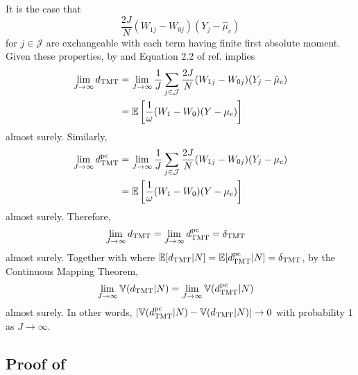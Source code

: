 \documentclass[12pt]{extarticle}
\newcommand{\E}{\mathbb{E}}
\newcommand{\nind}{J}
\newcommand{\tmt}{{\normalfont \text{TMT}}}
\newcommand{\dtmtpc}{d_{\tmt}^{\normalfont \text{pc}}}
\newcommand{\V}{\mathbb{V}}
\newcommand{\cJ}{\mathcal{J}}
\begin{document}
{{It is the case that 
$$
\frac{2\nind}{N} (W_{1j}-W_{0j})(Y_j-\hat{\mu}_c)
$$ 
for $j \in \cJ$ are exchangeable with each term having finite first absolute moment.  Given these properties, by  and Equation 2.2 of ref. \citep{kingman1978} implies
{\allowdisplaybreaks \begin{align*}
\lim_{\nind \to \infty} d_{\tmt} & = \lim_{\nind \to \infty}\frac{1}{\nind}\sum_{j\in \cJ}\frac{2\nind}{N} (W_{1j}-W_{0j})(Y_j-\hat{\mu}_c) \nonumber \\
& = \E \left[ \frac{1}{\omega}(W_1-W_0)(Y-\mu_c) \right]
\end{align*}}almost surely. Similarly,
{\allowdisplaybreaks \begin{align*}
\lim_{\nind \to \infty} \dtmtpc & = \lim_{\nind \to \infty}\frac{1}{\nind}\sum_{j\in \cJ}\frac{2\nind}{N} (W_{1j}-W_{0j})(Y_j-\mu_c) \nonumber \\
& = \E \left[ \frac{1}{\omega}(W_1-W_0)(Y-\mu_c) \right]
\end{align*}}almost surely. Therefore, 
{\allowdisplaybreaks \begin{align*}
\lim_{\nind \to \infty} d_{\tmt} & = \lim_{\nind \to \infty} \dtmtpc = \delta_{\tmt}
\end{align*}}almost surely. Together with  where $\E[d_{\tmt}|N]=\E[\dtmtpc|N]=\delta_{\tmt}$, by the Continuous Mapping Theorem, 
\begin{align*}\lim_{\nind \to \infty}\V(d_{\tmt}|N) & = \lim_{\nind \to \infty}\V(\dtmtpc|N)
\end{align*} almost surely. In other words, $|\V(\dtmtpc|N) - \V(d_{\tmt}|N)|\to 0$ with probability 1 as $\nind \to \infty$. 

\subsection{Proof of } \label{app:delta_tdt}

}}
\end{document}

